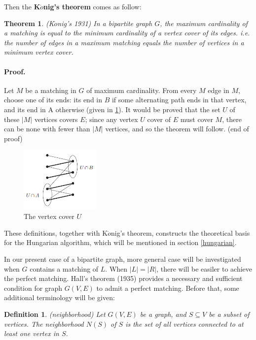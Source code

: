 \documentclass[14pt]{extarticle}
\newtheorem{theorem}{Theorem}
\newtheorem{definition}{Definition}
\begin{document}
Then the \textbf{K$\ddot{o}$nig's theorem} comes as follow:

\begin{theorem}
  (K$\ddot{o}$nig's 1931)
  In a bipartite graph $G$, the maximum cardinality of a matching is equal to the minimum cardinality of a vertex cover of its edges.
  i.e. the number of edges in a maximum matching equals the number of vertices in a minimum vertex cover.
\end{theorem}  

\paragraph{Proof.} 
Let $M$ be a matching in $G$ of maximum cardinality. 
From every $M$ edge in $M$, choose one of its ends: its end in $B$ if some alternating path ends in that vertex, and its end in A otherwise (given in \ref{konig_proof}). 
It would be proved that the set $U$ of these $\lvert M \rvert$ vertices covers $E$; 
since any vertex $U$ cover of $E$ must cover $M$, there can be none with fewer than $\lvert M \rvert$ vertices,
and so the theorem will follow.
(end of proof)

\begin{figure}[H] \label{konig_proof}
  \centering
  \includegraphics[width=0.35\textwidth]{konig's_proof.png}
  \caption{The vertex cover $U$ \cite{Diestel2017}}
\end{figure}

These definitions, together with K$\ddot{o}$nig's theorem, constructs the theoretical basis for the Hungarian algorithm, which will be mentioned in section \ref{hungarian}.

In our present case of a bipartite graph, more general case will be investigated when $G$ contains a matching of $L$.
When $\lvert L \rvert = \lvert R \rvert$, there will be easiler to achieve the perfect matching.
Hall's theorem (1935) provides a necessary and sufficient condition for graph $G(V,E)$ to admit a perfect matching.
Before that, some additional terminology will be given:

\begin{definition}
  (neighborhood) 
  Let $G(V,E)$ be a graph, and $S\subseteq V$ be a subset of vertices. 
  The neighborhood $N(S)$ of $S$ is the set of all vertices connected to at least one vertex in $S$.
\end{definition}
\end{document}
